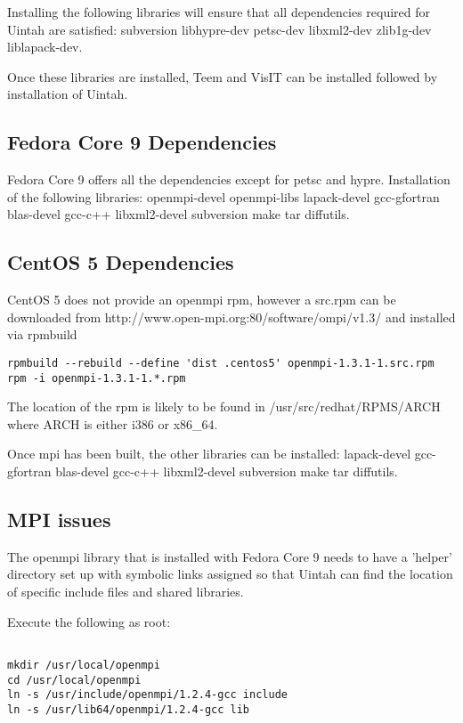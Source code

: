 Installing the following libraries will ensure that all dependencies
required for Uintah are satisfied: subversion libhypre-dev petsc-dev
libxml2-dev zlib1g-dev liblapack-dev.

Once these libraries are installed, Teem and VisIT can be installed
followed by installation of Uintah.

\subsection{Fedora Core 9 Dependencies}

Fedora Core 9 offers all the dependencies except for petsc and hypre.
Installation of the following libraries: openmpi-devel openmpi-libs
lapack-devel gcc-gfortran blas-devel gcc-c++ libxml2-devel subversion
make tar diffutils.

\subsection{CentOS 5 Dependencies}

CentOS 5 does not provide an openmpi rpm, however a src.rpm can be
downloaded from http://www.open-mpi.org:80/software/ompi/v1.3/ and
installed via rpmbuild

\begin{Verbatim}
rpmbuild --rebuild --define 'dist .centos5' openmpi-1.3.1-1.src.rpm
rpm -i openmpi-1.3.1-1.*.rpm
\end{Verbatim}

The location of the rpm is likely to be found in
/usr/src/redhat/RPMS/ARCH where ARCH is either i386 or x86\_64.

Once mpi has been built, the other libraries can be installed:
lapack-devel gcc-gfortran blas-devel gcc-c++ libxml2-devel subversion
make tar diffutils.

\subsection{MPI issues}

The openmpi library that is installed with Fedora Core 9 needs to have
a 'helper' directory set up with symbolic links assigned so that
Uintah can find the location of specific include files and shared
libraries.

Execute the following as root:

\begin{Verbatim}

mkdir /usr/local/openmpi
cd /usr/local/openmpi
ln -s /usr/include/openmpi/1.2.4-gcc include
ln -s /usr/lib64/openmpi/1.2.4-gcc lib

\end{Verbatim}



